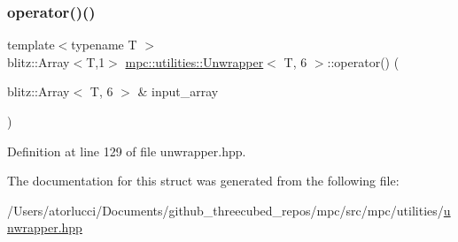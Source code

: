 \subsubsection{\texorpdfstring{operator()()}{operator()()}}
{\footnotesize\ttfamily template$<$typename T $>$ \\
blitz\+::\+Array$<$T,1$>$ \mbox{\hyperlink{structmpc_1_1utilities_1_1_unwrapper}{mpc\+::utilities\+::\+Unwrapper}}$<$ T, 6 $>$\+::operator() (\begin{DoxyParamCaption}\item[{blitz\+::\+Array$<$ T, 6 $>$ \&}]{input\+\_\+array }\end{DoxyParamCaption})\hspace{0.3cm}{\ttfamily [inline]}}



Definition at line 129 of file unwrapper.\+hpp.



The documentation for this struct was generated from the following file\+:\begin{DoxyCompactItemize}
\item 
/\+Users/atorlucci/\+Documents/github\+\_\+threecubed\+\_\+repos/mpc/src/mpc/utilities/\mbox{\hyperlink{unwrapper_8hpp}{unwrapper.\+hpp}}\end{DoxyCompactItemize}
